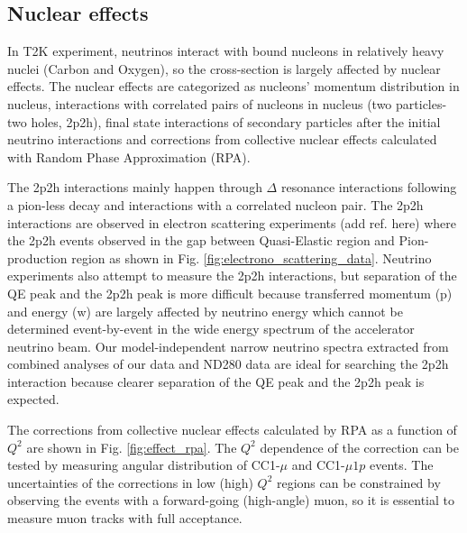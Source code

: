 \subsection{Nuclear effects}
In T2K experiment, neutrinos interact with bound nucleons in relatively heavy nuclei (Carbon and Oxygen), so the cross-section is largely affected by nuclear effects.
The nuclear effects are categorized as nucleons' momentum distribution in nucleus, interactions with  correlated pairs of nucleons in nucleus (two particles-two holes, 2p2h), final state interactions of secondary particles after the initial neutrino interactions and corrections from collective nuclear effects   calculated with Random Phase Approximation (RPA).


The 2p2h interactions mainly happen through $\Delta$ resonance interactions following a pion-less decay and interactions with a correlated nucleon pair.
The 2p2h interactions are observed in electron scattering experiments (add ref. here) where the 2p2h events observed in the gap between Quasi-Elastic region and Pion-production region as shown in Fig. \ref{fig:electrono_scattering_data}.
Neutrino experiments also attempt to measure the 2p2h interactions, but separation of the QE peak and the 2p2h peak is more difficult because transferred momentum (p) and energy (w) are largely affected by  neutrino energy which cannot be determined event-by-event in the wide energy spectrum of the accelerator neutrino beam.
Our model-independent narrow neutrino spectra extracted from combined analyses of our data and ND280 data are ideal for searching the 2p2h interaction because clearer separation of the QE peak and the 2p2h peak is expected.


The corrections from collective nuclear effects calculated by RPA as a function of $Q^{2}$ are shown in Fig. \ref{fig:effect_rpa}.
The $Q^{2}$ dependence of the correction can be tested by measuring angular distribution of CC1-$\mu$ and CC1-$\mu 1p$ events.
The uncertainties of the corrections in low (high) $Q^{2}$ regions can be constrained by observing the events with a forward-going (high-angle) muon, so it is essential to measure muon tracks with full acceptance.






